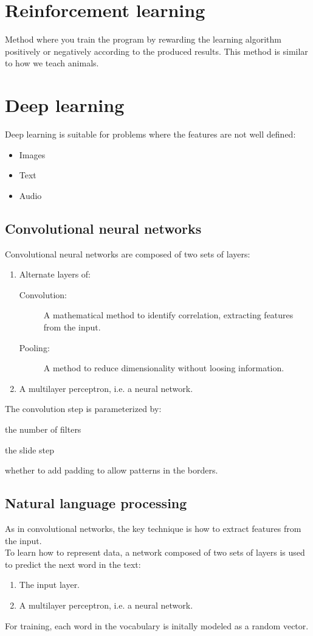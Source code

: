 \documentclass[11pt]{article}
\begin{document}
\section{Reinforcement learning}
\label{sec:orgf9737e1}
Method where you train the program by rewarding the learning algorithm positively or
negatively according to the produced results. This method is similar to how we teach
animals.
\pagebreak
\section{Deep learning}
\label{sec:org36a970a}
Deep learning is suitable for problems where the features are not well defined:
\begin{itemize}[itemsep=0pt]
\item Images
\item Text
\item Audio
\end{itemize}
\subsection{Convolutional neural networks}
\label{sec:orgf6fc7e7}
Convolutional neural networks are composed of two sets of layers:
\begin{enumerate}[itemsep=0pt]
\item Alternate layers of:
\begin{description}
\item[{Convolution:}] A mathematical method to identify correlation, extracting features
from the input.
\item[{Pooling:}] A method to reduce dimensionality without loosing information.
\vspace{3pt}
\end{description}
\item A multilayer perceptron, i.e. a neural network.
\end{enumerate}
The convolution step is parameterized by:
\begin{description}[itemsep=0pt]
\item[{Depth:}] the number of filters
\item[{Stride:}] the slide step
\item[{Zero-padding:}] whether to add padding to allow patterns in the borders.
\end{description}
\subsection{Natural language processing}
\label{sec:org2455d6b}
As in convolutional networks, the key technique is how to extract features from the
input. \\
To learn how to represent data, a network composed of two sets of layers is used to
predict the next word in the text:
\begin{enumerate}[itemsep=0pt]
\item The input layer.
\item A multilayer perceptron, i.e. a neural network.
\end{enumerate}
For training, each word in the vocabulary is initally modeled as a random vector. \\
\end{document}
